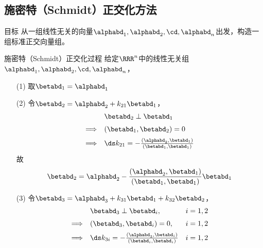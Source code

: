 \subsection{施密特（Schmidt）正交化方法}
\begin{frame}
  \begin{footnotesize}
    \begin{block}{目标}
      从一组线性无关的向量$\alphabd_1,\alphabd_2,\cd,\alphabd_n$出发，构造一组标准正交向量组。
    \end{block}
  \end{footnotesize}
\end{frame}


\begin{frame}
  \begin{footnotesize}
    \begin{block}{施密特（Schmidt）正交化过程}
      给定$\RRR^n$中的线性无关组$\alphabd_1,\alphabd_2,\cd,\alphabd_n$，
      \begin{itemize}
      \item[(1)] 取$\betabd_1=\alphabd_1$
      \item[(2)] 令$\betabd_2=\alphabd_2+k_{21}\betabd_1$，
        $$
        \begin{array}{rl}
          &\betabd_2\perp\betabd_1\\[0.2cm]
          \Longrightarrow&(\betabd_1,\betabd_2)=0\\[0.2cm]
          \Longrightarrow& \ds k_{21}=-\frac{(\alphabd_2,\betabd_1)}{(\betabd_1,\betabd_1)}
        \end{array}
        $$
        故
        $$
        \betabd_2=\alphabd_2-\frac{(\alphabd_2,\betabd_1)}{(\betabd_1,\betabd_1)}\betabd_1
        $$
      \item[(3)] 令$\betabd_3=\alphabd_3+k_{31}\betabd_1+k_{32}\betabd_2$，
        $$
        \begin{array}{rll}
          &\betabd_3\perp\betabd_i, & i=1,2\\[0.2cm]
          \Longrightarrow&(\betabd_3,\betabd_i)=0, & i=1,2\\[0.2cm]
          \Longrightarrow& \ds k_{3i}=-\frac{(\alphabd_3,\betabd_i)}{(\betabd_i,\betabd_i)} & i=1,2
        \end{array}
        $$
      \end{itemize}
    \end{block}

  \end{footnotesize}
\end{frame}


